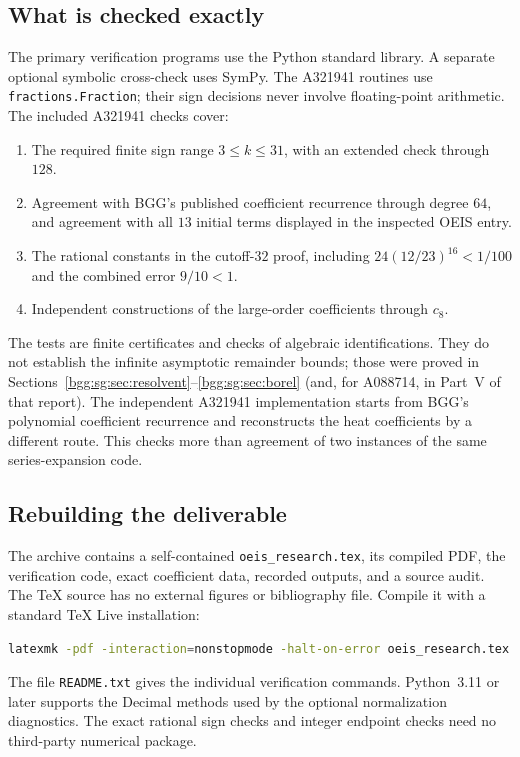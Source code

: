 \documentclass[11pt,a4paper]{article}
\numberwithin{equation}{section}
\theoremstyle{definition}
\theoremstyle{remark}
\theoremstyle{definition}
\begin{document}
\subsection{What is checked exactly}

The primary verification programs use the Python standard library.
A separate optional symbolic cross-check uses SymPy.
The A321941 routines use \texttt{fractions.Fraction}; their sign
decisions never involve floating-point arithmetic.  The included
A321941 checks cover:
\begin{enumerate}
\item The required finite sign range \(3\le k\le31\), with an
extended check through \(128\).
\item Agreement with BGG's published coefficient recurrence through
degree \(64\), and agreement with all \(13\) initial terms displayed
in the inspected OEIS entry.
\item The rational constants in the cutoff-\(32\) proof, including
\(24(12/23)^{16}<1/100\) and the combined error \(9/10<1\).
\item Independent constructions of the large-order coefficients
through \(c_8\).
\end{enumerate}

The tests are finite certificates and checks of algebraic
identifications.  They do not establish the infinite asymptotic
remainder bounds; those were proved in
Sections~\ref{bgg:sg:sec:resolvent}--\ref{bgg:sg:sec:borel} (and, for
A088714, in Part~V of that report).
The independent A321941 implementation starts from BGG's polynomial
coefficient recurrence and reconstructs the heat coefficients by a
different route.  This checks more than agreement of two instances
of the same series-expansion code.

\subsection{Rebuilding the deliverable}

The archive contains a self-contained \texttt{oeis\_research.tex},
its compiled PDF, the verification code, exact coefficient data,
recorded outputs, and a source audit.  The TeX source has no
external figures or bibliography file.
Compile it with a standard TeX Live installation:
\begin{lstlisting}[language=bash]
latexmk -pdf -interaction=nonstopmode -halt-on-error oeis_research.tex
\end{lstlisting}
The file \texttt{README.txt} gives the individual verification commands.
Python~3.11 or later supports the Decimal methods used by the optional
normalization diagnostics.  The exact rational sign checks and
integer endpoint checks need no third-party numerical package.
\end{document}
